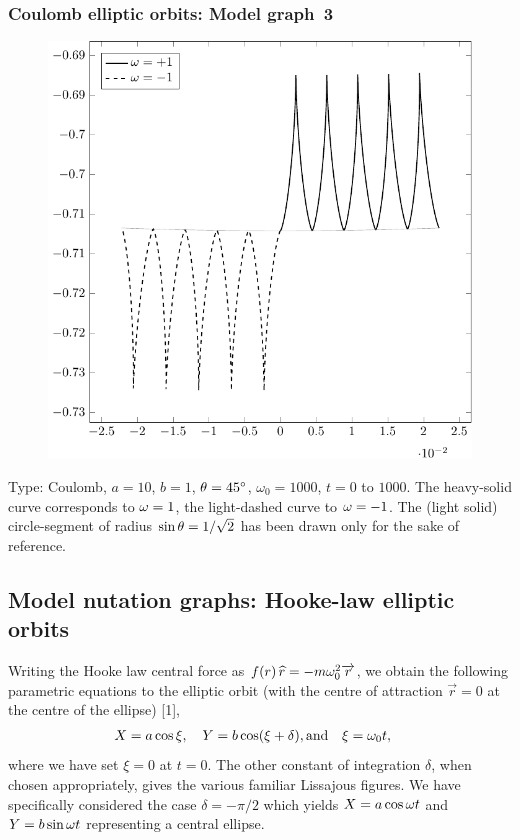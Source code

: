 \subsubsection*{Coulomb elliptic orbits: Model graph~3} 
\begin{figure}[H]
\centering
\includegraphics[scale=.5]{src/images/lbk-graphics/larm-c-10-1-45-1-1000.pdf}
\caption*{}
\end{figure}

Type: Coulomb, $a = 10$, $b =1$, ${\theta} = \ang{45}$, 
$\omega_0 = 1000$, $t=0$ to $1000$. The heavy-solid 
curve corresponds to ${\omega} = 1$, the light-dashed curve to 
${\omega} = -1$. The (light solid) circle-segment of radius 
$\sin {\theta} = 1 / \sqrt{2}$ has been drawn only for the sake 
of reference.

\subsection{Model nutation graphs: Hooke-law elliptic\\ orbits}
Writing the Hooke law central force as $f(r)\,{\widehat{r}} = -m 
{\omega}_{0}^{2} \overrightarrow{r}$, we obtain the following parametric 
equations to the elliptic orbit  (with the centre of 
attraction $\vec{r} = 0$ at the centre of the ellipse) [1], 
\begin{align}
 X &= a \cos\xi,\quad Y = b \cos(\xi + \delta), 
\text{and}\quad  \xi = {\omega}_{0} t,
\label{eq:ln8}
\end{align}
where we have set $\xi = 0$ at $t = 0$. The other constant 
of integration $\delta$, when chosen appropriately, gives 
the various familiar Lissajous figures. We have specifically 
considered the case $\delta = -\pi/2$ which yields $X= 
a\cos{\omega} t$ and $Y = b\sin{\omega} t$ representing a central 
ellipse. 

